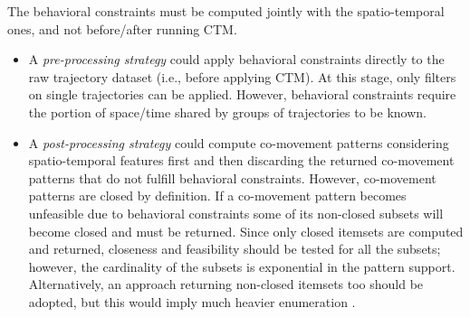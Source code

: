 \documentclass[
]{ceurart}
\begin{document}
The behavioral constraints must be computed jointly with the spatio-temporal ones, and not before/after running CTM.
\begin{itemize}
    \item A \textit{pre-processing strategy} could apply behavioral constraints directly to the raw trajectory dataset (i.e., before applying CTM). 
    At this stage, only filters on single trajectories can be applied.
    However, behavioral constraints require the portion of space/time shared by groups of trajectories to be known. 
    \item A \textit{post-processing strategy} could compute co-movement patterns considering spatio-temporal features first and then discarding the returned co-movement patterns that do not fulfill behavioral constraints.
    However, co-movement patterns are closed by definition.
    If a co-movement pattern becomes unfeasible due to behavioral constraints some of its non-closed subsets will become closed and must be returned. 
    Since only closed itemsets are computed and returned, closeness and feasibility should be tested for all the subsets; however, the cardinality of the subsets is exponential in the pattern support.
    Alternatively, an approach returning non-closed itemsets too should be adopted, but this would imply much heavier enumeration \citep{DBLP:journals/tkde/LuccheseOP06}. 
\end{itemize}
\end{document}
